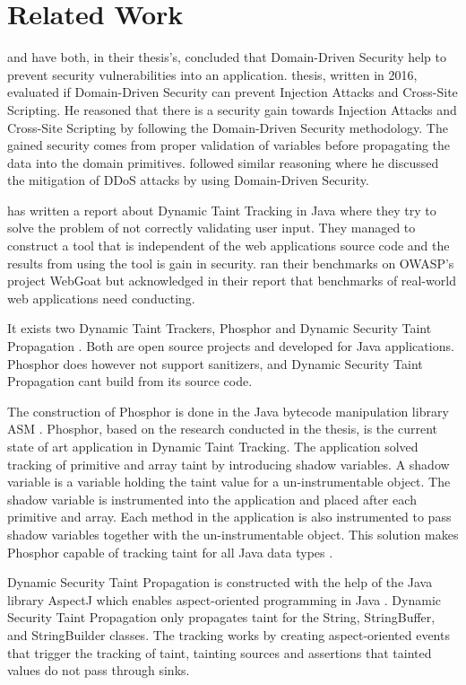 \chapter{Related Work}
\textcite{Stendahl2016} and \textcite{Arnor2016} have both, in their thesis's, concluded that Domain-Driven Security help to prevent security vulnerabilities into an application. \textcite{Stendahl2016} thesis, written in 2016, evaluated if Domain-Driven Security can prevent Injection Attacks and Cross-Site Scripting. He reasoned that there is a security gain towards Injection Attacks and Cross-Site Scripting by following the Domain-Driven Security methodology. The gained security comes from proper validation of variables before propagating the data into the domain primitives. \textcite{Arnor2016} followed similar reasoning where he discussed the mitigation of DDoS attacks by using Domain-Driven Security.

\textcite{Haldar} has written a report about Dynamic Taint Tracking in Java where they try to solve the problem of not correctly validating user input. They managed to construct a tool that is independent of the web applications source code and the results from using the tool is gain in security. \textcite{Haldar} ran their benchmarks on OWASP’s project WebGoat \parencite{webgoat} but acknowledged in their report that benchmarks of real-world web applications need conducting.

It exists two Dynamic Taint Trackers, Phosphor \parencite{phosphor} and Dynamic Security Taint Propagation \parencite{securityTaint}. Both are open source projects and developed for Java applications. Phosphor does however not support sanitizers, and Dynamic Security Taint Propagation cant build from its source code.

The construction of Phosphor \parencite{phosphor} is done in the Java bytecode manipulation library ASM \parencite{asm}. Phosphor, based on the research conducted in the thesis, is the current state of art application in Dynamic Taint Tracking. The application solved tracking of primitive and array taint by introducing shadow variables. A shadow variable is a variable holding the taint value for a un-instrumentable object. The shadow variable is instrumented into the application and placed after each primitive and array. Each method in the application is also instrumented to pass shadow variables together with the un-instrumentable object. This solution makes Phosphor capable of tracking taint for all Java data types \parencite{BellJ.2014PIdd}.

Dynamic Security Taint Propagation \parencite{securityTaint} is constructed with the help of the Java library AspectJ which enables aspect-oriented programming in Java \parencite{aspectj}. Dynamic Security Taint Propagation only propagates taint for the String, StringBuffer, and StringBuilder classes. The tracking works by creating aspect-oriented events that trigger the tracking of taint, tainting sources and assertions that tainted values do not pass through sinks.